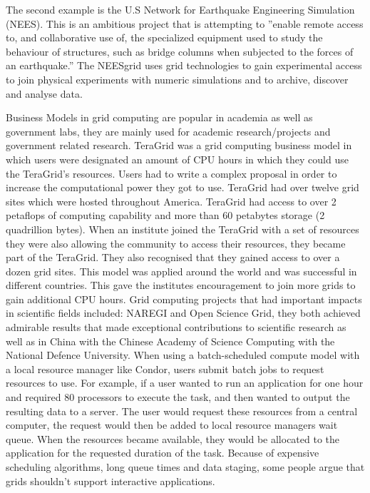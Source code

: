 \documentclass[10pt,journal,compsoc]{IEEEtran}
\begin{document}
\hspace{-0.5cm}The second example is the U.S Network for Earthquake Engineering Simulation (NEES). This is an ambitious project that is attempting to ''enable remote access to, and collaborative use of, the specialized equipment used to study the behaviour of structures, such as bridge columns when subjected to the forces of an earthquake.'' \cite{GridNutShell}  The NEESgrid uses grid technologies to gain experimental access to join physical experiments with numeric simulations and to archive, discover and analyse data. \cite{NEES}  \cite{earthquake}
\newline \newline \newline

\hspace{-0.5cm}Business Models in grid computing are popular in academia as well as government labs, they are mainly used for academic research/projects and government related research. TeraGrid was a grid computing business model in which users were designated an amount of CPU hours in which they could use the TeraGrid's resources. Users had to write a complex proposal in order to increase the computational power they got to use. TeraGrid had over twelve grid sites which were hosted throughout America. TeraGrid had access to over 2 petaflops of computing capability and more than 60 petabytes storage (2 quadrillion bytes). When an institute joined the TeraGrid with a set of resources they were also allowing the community to access their resources, they became part of the TeraGrid. They also recognised that they gained access to over a dozen grid sites. This model was applied around the world and was successful in different countries. This gave the institutes encouragement to join more grids to gain additional CPU hours. \cite{GridAndCloud} \newline \newline
Grid computing projects that had important impacts in scientific fields included: NAREGI and Open Science Grid, they both achieved admirable results that made exceptional contributions to scientific research as well as in China with the Chinese Academy of Science Computing with the National Defence University. \cite{GridOrCloud} When using a batch-scheduled compute model with a local resource manager like Condor, users submit batch jobs to request resources to use. For example, if a user wanted to run an application for one hour and required 80 processors to execute the task, and then wanted to output the resulting data to a server. The user would request these resources from a central computer, the request would then be added to local resource managers wait queue. When the resources became available, they would be allocated to the application for the requested duration of the task. Because of expensive scheduling algorithms, long queue times and data staging, some people argue that grids shouldn't support interactive applications. 
\end{document}
